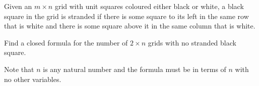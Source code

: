 Given an $m\times n$ grid with unit squares coloured either black or white, a black square in the grid is stranded if there is some square to its left in the same row that is white and there is some square above it in the same column that is white.

Find a closed formula for the number of $2\times n$ grids with no stranded black square.

Note that $n$ is any natural number and the formula must be in terms of $n$ with no other variables.